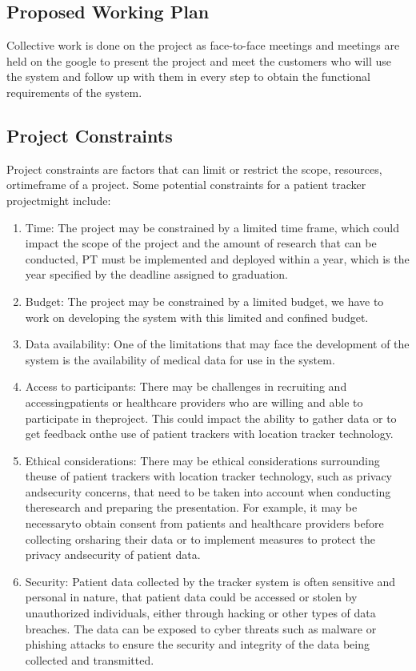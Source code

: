 \documentclass[12pt]{article}
\begin{document}
		\subsection{Proposed Working Plan}
		
		\quad Collective work is done on the project as face-to-face meetings and meetings are held on the google to present the project and meet the customers who will use the system and follow up with them in every step to obtain the functional requirements of the system.
			
		\subsection{Project Constraints }
		
			\quad Project constraints are factors that can limit or restrict the scope, resources, ortimeframe of a project. Some potential constraints for a patient tracker projectmight include:
			\begin{enumerate}
				\item Time: The project may be constrained by a limited time frame, which could impact the scope of the project and the amount of research that can be conducted, PT must be implemented and deployed within a year, which is the year specified by the deadline assigned to graduation.
				\item Budget: The project may be constrained by a limited budget, we have to work on developing the system with this limited and confined budget.
				\item Data availability: One of the limitations that may face the development of the system is the availability of medical data for use in the system.
				\item Access to participants: There may be challenges in recruiting and accessingpatients or healthcare providers who are willing and able to participate in theproject. This could impact the ability to gather data or to get feedback onthe use of patient trackers with location tracker technology.
				\item Ethical considerations: There may be ethical considerations surrounding theuse of patient trackers with location tracker technology, such as privacy andsecurity concerns, that need to be taken into account when conducting theresearch and preparing the presentation. For example, it may be necessaryto obtain consent from patients and healthcare providers before collecting orsharing their data or to implement measures to protect the privacy andsecurity of patient data.
				\item Security: Patient data collected by the tracker system is often sensitive and personal in nature, that patient data could be accessed or stolen by unauthorized individuals, either through hacking or other types of data breaches. The data can be exposed to cyber threats such as malware or phishing attacks to ensure the security and integrity of the data being collected and transmitted.
			\end{enumerate}
\end{document}
